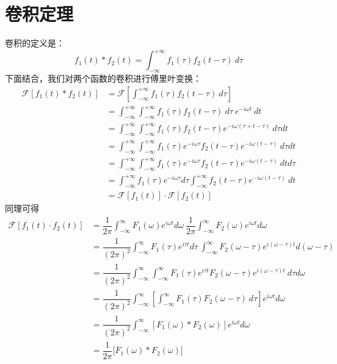     \section{卷积定理}
        卷积的定义是：
        \begin{equation}
            f_1(t)*f_2(t) = \int_{-\infty}^{+\infty}f_1(\tau)f_2(t - \tau)\ d\tau
            \label{eq: 1.31}
        \end{equation}
        下面结合，我们对两个函数的卷积进行傅里叶变换：
        \begin{equation}
            \begin{split}
                \mathscr{F}[f_1(t)*f_2(t)] &= \mathscr{F}[\int_{-\infty}^{+\infty}f_1(\tau)f_2(t - \tau)\ d\tau]\\
                &= \int_{-\infty}^{+\infty}\int_{-\infty}^{+\infty}f_1(\tau)f_2(t - \tau)\ d\tau\ e^{-i\omega t}\ dt\\
                &= \int_{-\infty}^{+\infty}\int_{-\infty}^{+\infty}f_1(\tau)f_2(t - \tau)e^{-i\omega (\tau + t -\tau)}\ d\tau dt\\
                &= \int_{-\infty}^{+\infty}\int_{-\infty}^{+\infty}f_1(\tau)e^{-i\omega \tau}f_2(t - \tau)e^{-i\omega (t - \tau)}\ d\tau dt\\
                &= \int_{-\infty}^{+\infty}\int_{-\infty}^{+\infty}f_1(\tau)e^{-i\omega \tau}f_2(t - \tau)e^{-i\omega (t - \tau)}\ dt d\tau\\
                &= \int_{-\infty}^{+\infty}f_1(\tau)e^{-i\omega \tau}d\tau\int_{-\infty}^{+\infty}f_2(t - \tau)e^{-i\omega (t - \tau)}\ dt\\
                &= \mathscr{F}[f_1(t)]\cdot\mathscr{F}[f_2(t)]
            \end{split}
            \label{eq: 1.32}
        \end{equation}
        同理可得
        \begin{equation}
            \begin{split}
                \mathscr{F}[f_1(t)\cdot f_2(t)] &= \dfrac{1}{2\pi}\int_{-\infty}^{\infty}F_1(\omega) e^{i\omega t} d\omega\ \dfrac{1}{2\pi}\int_{-\infty}^{\infty}F_2(\omega) e^{i\omega t} d\omega\\
                &= \dfrac{1}{(2\pi)^2}\int_{-\infty}^{\infty}F_1(\tau) e^{i\tau t} d\tau\ \int_{-\infty}^{\infty}F_2(\omega - \tau) e^{i(\omega - \tau) t} d(\omega - \tau)\\
                &= \dfrac{1}{(2\pi)^2}\int_{-\infty}^{\infty}\int_{-\infty}^{\infty}F_1(\tau) e^{i\tau t} F_2(\omega - \tau) e^{i(\omega - \tau) t}\ d\tau d\omega\\
                &= \dfrac{1}{(2\pi)^2}\int_{-\infty}^{\infty}\left[\int_{-\infty}^{\infty}F_1(\tau) F_2(\omega - \tau)\ d\tau\right]e^{i\omega t}d\omega\\
                &= \dfrac{1}{(2\pi)^2}\int_{-\infty}^{\infty}\left[F_1(\omega)*F_2(\omega)\right]e^{i\omega t}d\omega\\
                &= \dfrac{1}{2\pi}\mathscr[F_1(\omega)*F_2(\omega)]
            \end{split}
            \label{eq: 1.33}
        \end{equation}
